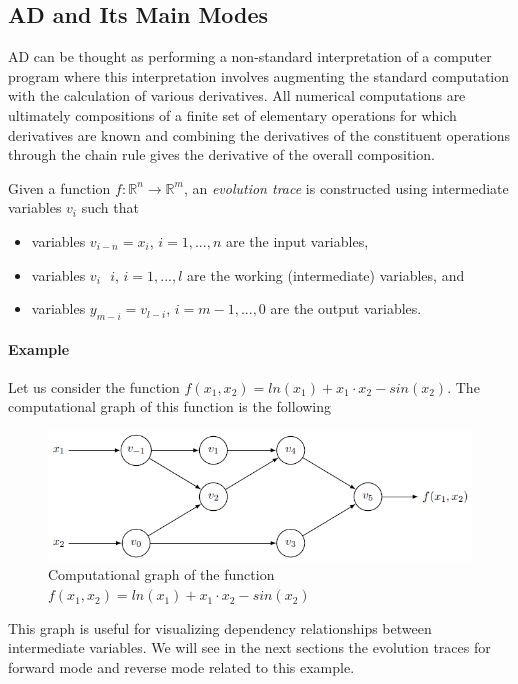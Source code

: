 \subsection{AD and Its Main Modes}
AD can be thought as performing a non-standard interpretation of a computer program where this interpretation involves augmenting the standard computation with the calculation of various derivatives. All numerical computations are ultimately compositions of a finite set of elementary operations for which derivatives are known and combining the derivatives of the constituent operations through the chain rule gives the derivative of the overall composition.

Given a function $f: \mathbb{R}^n \rightarrow \mathbb{R}^m$, an \emph{evolution trace} is constructed using intermediate variables $v_i$ such that
\begin{itemize}
	\item variables $v_{i-n}=x_i$, $i=1,...,n$ are the input variables,
	\item variables $v_{i} \mbox{ } i$, $i=1,...,l$ are the working (intermediate) variables, and
	\item variables $y_{m-i}=v_{l-i}$, $i=m-1,...,0$ are the output variables.
\end{itemize}

\paragraph{Example} Let us consider the function $f(x_1,x_2)= ln(x_1)+ x_1 \cdot x_2 -sin(x_2)$. The computational graph of this function is the following

\begin{figure}[h!]
	\centering
	\includegraphics[scale=0.9]{img/compGraph}
	\caption{Computational graph of the function $f(x_1,x_2)= ln(x_1)+ x_1 \cdot x_2 -sin(x_2)$}
	\label{compGraph}
\end{figure}
\noindent This graph is useful for visualizing dependency relationships between intermediate variables. We will see in the next sections the evolution traces for forward mode and reverse mode related to this example.


